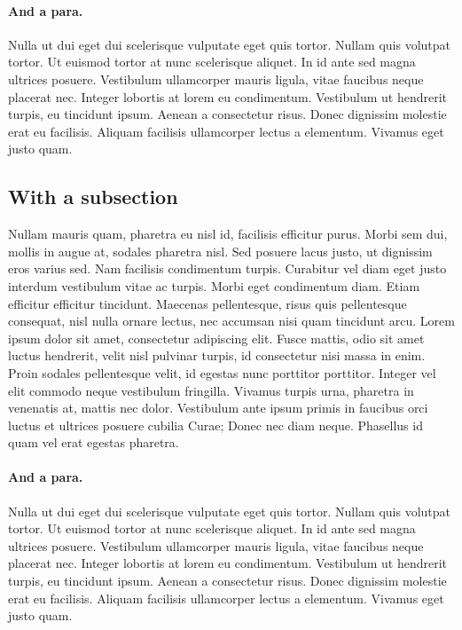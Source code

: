 \paragraph{And a para.} Nulla ut dui eget dui scelerisque vulputate eget quis tortor. Nullam
quis volutpat tortor. Ut euismod tortor at nunc scelerisque
aliquet. In id ante sed magna ultrices posuere. Vestibulum ullamcorper
mauris ligula, vitae faucibus neque placerat nec. Integer lobortis at
lorem eu condimentum. Vestibulum ut hendrerit turpis, eu tincidunt
ipsum. Aenean a consectetur risus. Donec dignissim molestie erat eu
facilisis. Aliquam facilisis ullamcorper lectus a elementum. Vivamus
eget justo quam.
\subsection{With a subsection}
Nullam mauris quam, pharetra eu nisl id, facilisis efficitur
purus. Morbi sem dui, mollis in augue at, sodales pharetra nisl. Sed
posuere lacus justo, ut dignissim eros varius sed. Nam facilisis
condimentum turpis. Curabitur vel diam eget justo interdum vestibulum
vitae ac turpis. Morbi eget condimentum diam. Etiam efficitur
efficitur tincidunt. Maecenas pellentesque, risus quis pellentesque
consequat, nisl nulla ornare lectus, nec accumsan nisi quam tincidunt
arcu. Lorem ipsum dolor sit amet, consectetur adipiscing elit. Fusce
mattis, odio sit amet luctus hendrerit, velit nisl pulvinar turpis, id
consectetur nisi massa in enim. Proin sodales pellentesque velit, id
egestas nunc porttitor porttitor. Integer vel elit commodo neque
vestibulum fringilla. Vivamus turpis urna, pharetra in venenatis at,
mattis nec dolor. Vestibulum ante ipsum primis in faucibus orci luctus
et ultrices posuere cubilia Curae; Donec nec diam neque. Phasellus id
quam vel erat egestas pharetra.

\paragraph{And a para.} Nulla ut dui eget dui scelerisque vulputate eget quis tortor. Nullam
quis volutpat tortor. Ut euismod tortor at nunc scelerisque
aliquet. In id ante sed magna ultrices posuere. Vestibulum ullamcorper
mauris ligula, vitae faucibus neque placerat nec. Integer lobortis at
lorem eu condimentum. Vestibulum ut hendrerit turpis, eu tincidunt
ipsum. Aenean a consectetur risus. Donec dignissim molestie erat eu
facilisis. Aliquam facilisis ullamcorper lectus a elementum. Vivamus
eget justo quam.
